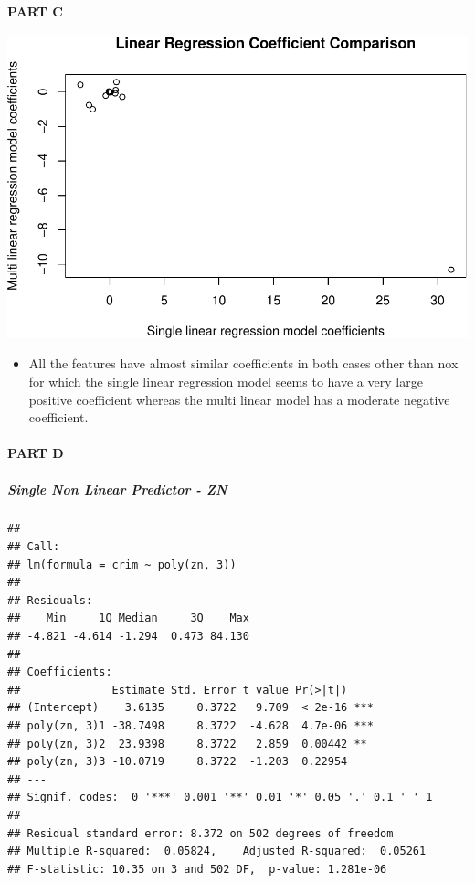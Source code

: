 \documentclass[
]{article}
\providecommand{\tightlist}{%
  \setlength{\itemsep}{0pt}\setlength{\parskip}{0pt}}
\begin{document}
\hypertarget{part-c-1}{%
\paragraph{PART C}\label{part-c-1}}

\begin{center}\includegraphics{Disha_Gandhi_Take_Home_Exam_PDF_files/figure-latex/unnamed-chunk-32-1} \end{center}

\begin{itemize}
\tightlist
\item
  All the features have almost similar coefficients in both cases other
  than nox for which the single linear regression model seems to have a
  very large positive coefficient whereas the multi linear model has a
  moderate negative coefficient.
\end{itemize}

\hypertarget{part-d-1}{%
\paragraph{PART D}\label{part-d-1}}

\hypertarget{single-non-linear-predictor---zn}{%
\subparagraph{\texorpdfstring{\textbf{Single Non Linear Predictor -
ZN}}{Single Non Linear Predictor - ZN}}\label{single-non-linear-predictor---zn}}

\begin{verbatim}
## 
## Call:
## lm(formula = crim ~ poly(zn, 3))
## 
## Residuals:
##    Min     1Q Median     3Q    Max 
## -4.821 -4.614 -1.294  0.473 84.130 
## 
## Coefficients:
##              Estimate Std. Error t value Pr(>|t|)    
## (Intercept)    3.6135     0.3722   9.709  < 2e-16 ***
## poly(zn, 3)1 -38.7498     8.3722  -4.628  4.7e-06 ***
## poly(zn, 3)2  23.9398     8.3722   2.859  0.00442 ** 
## poly(zn, 3)3 -10.0719     8.3722  -1.203  0.22954    
## ---
## Signif. codes:  0 '***' 0.001 '**' 0.01 '*' 0.05 '.' 0.1 ' ' 1
## 
## Residual standard error: 8.372 on 502 degrees of freedom
## Multiple R-squared:  0.05824,    Adjusted R-squared:  0.05261 
## F-statistic: 10.35 on 3 and 502 DF,  p-value: 1.281e-06
\end{verbatim}
\end{document}
